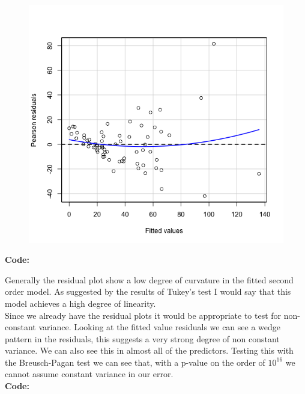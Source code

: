 \documentclass[12pt]{article}
\makeatletter
\theoremstyle{homework}
\newenvironment{exercise}[1]
{\def\@currentlabel{#1}\exercisecore}
{\endexercisecore}
\makeatother
\begin{document}
\begin{exercise}{1}
\begin{enumerate}
\begin{figure}[H]
\begin{center}
  \includegraphics[width = \textwidth]{Rplot01.png}
  \end{center}
\end{figure}
      \textbf{Code:}
       \begin{center}
       
       \end{center} 
       Generally the residual plot show a low degree of curvature in the fitted second order model. As suggested by the results of Tukey's test 
       I would say that this model achieves a high degree of linearity. \\ 
       Since we already have the residual plots it would be appropriate to test for non-constant variance. Looking at the fitted value
       residuals we can see a wedge pattern in the residuals, this suggests a very strong degree of non constant variance. We can also see this in almost all of 
       the predictors. Testing this with the Breusch-Pagan test we can see that, with a p-value on the order of $10^{16}$ we cannot assume constant variance in our error.\\
       \textbf{Code:}
       \begin{center}
       
       \end{center} 
       
       
       

\end{enumerate}
\end{exercise}
\end{document}
